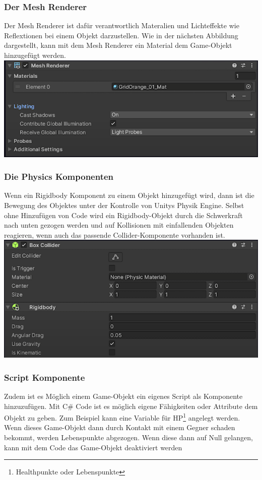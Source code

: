 \pagebreak

\subsubsection{Der Mesh Renderer}
Der Mesh Renderer ist dafür verantwortlich Materalien und Lichteffekte wie Reflextionen bei einem Objekt darzustellen. Wie in der nächsten Abbildung dargestellt, kann mit dem Mesh Renderer ein Material dem Game-Objekt hinzugefügt werden.\\
\noindent
\includegraphics[width=0.7\linewidth]{chapters/14/Images/MeshRenderer.png}

\subsubsection{Die Physics Komponenten}
\glqq Wenn ein Rigidbody Komponent zu einem Objekt hinzugefügt wird, dann ist die Bewegung des Objektes unter der Kontrolle von Unitys Physik Engine. Selbst ohne Hinzufügen von Code wird ein Rigidbody-Objekt durch die Schwerkraft nach unten gezogen werden und auf Kollisionen mit einfallenden Objekten reagieren, wenn auch das passende Collider-Komponente vorhanden ist.\grqq \cite[][Rigidbody, Unity Documentation]{unitydocRigidbody} \\

\noindent
\includegraphics[width=0.7\linewidth]{chapters/14/Images/Physics.png}

\subsubsection{Script Komponente}
Zudem ist es Möglich einem Game-Objekt ein eigenes Script als Komponente hinzuzufügen. Mit C\# Code ist es möglich eigene Fähigkeiten oder Attribute dem Objekt zu geben. Zum Beispiel kann eine Variable für HP\footnote[1]{Healthpunkte oder Lebenspunkte} angelegt werden. Wenn dieses Game-Objekt dann durch Kontakt mit einem Gegner schaden bekommt, werden Lebenspunkte abgezogen. Wenn diese dann auf Null gelangen, kann mit dem Code das Game-Objekt deaktiviert werden


